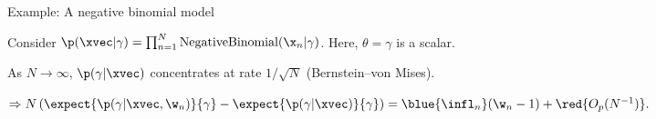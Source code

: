     



\begin{frame}[t]{Example: A negative binomial model}


Consider $\p(\xvec \vert \gamma) = \prod_{n=1}^N \textrm{NegativeBinomial}(\x_n \vert \gamma)$. Here, $\theta = \gamma$ is a scalar.  

\pause
As $N \rightarrow \infty$, $\p(\gamma \vert \xvec)$ concentrates at rate $1 / \sqrt{N}$ (Bernstein--von Mises).

$\Rightarrow 
N \left( \expect{\p(\gamma \vert \xvec, \w_n)}{\gamma} -
\expect{\p(\gamma \vert \xvec)}{\gamma} \right) = \blue{\infl_n} (\w_n - 1) + \red{O_p(N^{-1})}.
$


\pause
\vspace{1.5em}
\LowDimAccuracyGraph{}

\pause
{}

\end{frame}
